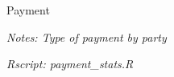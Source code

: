 \documentclass[11pt]{article}
\begin{document}
\begin{table}[H]
 \caption{Payment}
 \label{Payment}
 \begin{center}
 \scriptsize{}
 \end{center}
  \footnotesize
 \textit{Notes: Type of payment by party} 
 
 \textit{Rscript: payment\_stats.R} \texttt{}
\end{table}
 
 
\end{document}
